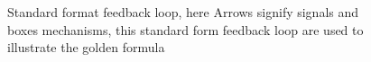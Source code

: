 \begin{figure}[H]
\begin{tikzpicture}[x=0.75pt,y=0.75pt,yscale=-1,xscale=1]
\end{tikzpicture}
    \caption{Standard format feedback loop, here Arrows signify signals and boxes mechanisms, this standard form feedback loop are used to illustrate the golden formula}
    \label{fig:FeedbackLoop}
\end{figure}
